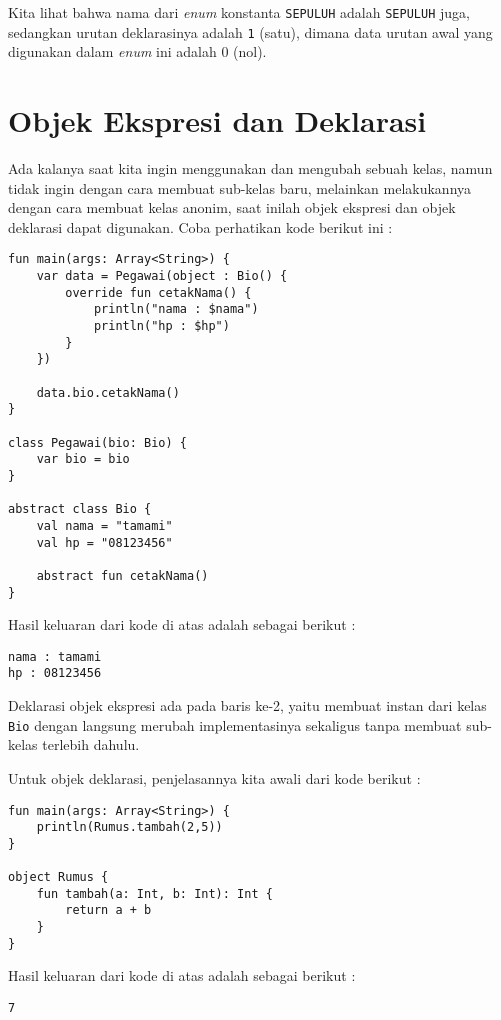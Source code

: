 Kita lihat bahwa nama dari \textit{enum} konstanta \texttt{SEPULUH} adalah \texttt{SEPULUH} juga, sedangkan urutan deklarasinya adalah \texttt{1} (satu), dimana data urutan awal yang digunakan dalam \textit{enum} ini adalah 0 (nol).

\section{Objek Ekspresi dan Deklarasi}

Ada kalanya saat kita ingin menggunakan dan mengubah sebuah kelas, namun tidak ingin dengan cara membuat sub-kelas baru, melainkan melakukannya dengan cara membuat kelas anonim, saat inilah objek ekspresi dan objek deklarasi dapat digunakan. Coba perhatikan kode berikut ini :

\begin{lstlisting}
fun main(args: Array<String>) {
	var data = Pegawai(object : Bio() {
		override fun cetakNama() {
			println("nama : $nama")
			println("hp : $hp")
		}
	})
	
	data.bio.cetakNama()
}

class Pegawai(bio: Bio) {
	var bio = bio
}

abstract class Bio {
	val nama = "tamami"
	val hp = "08123456"
	
	abstract fun cetakNama()
}
\end{lstlisting}

Hasil keluaran dari kode di atas adalah sebagai berikut :

\begin{lstlisting}
nama : tamami
hp : 08123456
\end{lstlisting}

Deklarasi objek ekspresi ada pada baris ke-2, yaitu membuat instan dari kelas \texttt{Bio} dengan langsung merubah implementasinya sekaligus tanpa membuat sub-kelas terlebih dahulu.

Untuk objek deklarasi, penjelasannya kita awali dari kode berikut :

\begin{lstlisting}
fun main(args: Array<String>) {
	println(Rumus.tambah(2,5))
}

object Rumus {
	fun tambah(a: Int, b: Int): Int {
		return a + b
	}
}
\end{lstlisting}

Hasil keluaran dari kode di atas adalah sebagai berikut :

\begin{lstlisting}
7
\end{lstlisting}

